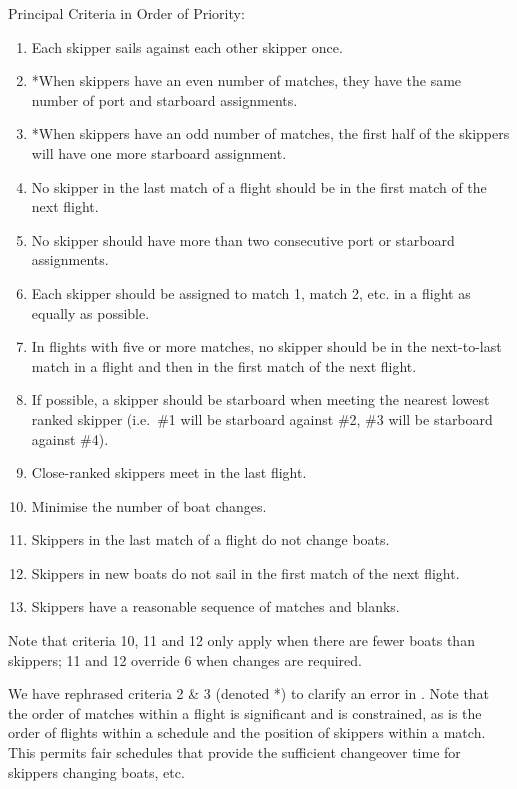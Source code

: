 \documentclass{llncs}
\begin{document}
\begin{framed}
Principal Criteria in Order of Priority:
\begin{enumerate}
\item Each skipper sails against each other skipper once.
\item *When skippers have an even number of matches, they have the same number of port and starboard assignments.
\item *When skippers have an odd number of matches, the first half of the skippers
    will have one more starboard assignment.
\item No skipper in the last match of a flight should be in the first match of
    the next flight.
\item No skipper should have more than two consecutive port or starboard
    assignments.
\item Each skipper should be assigned to match 1, match 2, etc. in a flight as
    equally as possible.
\item In flights with five or more matches, no skipper should be in the
    next-to-last match in a flight and then in the first match of the next
    flight.
\item If possible, a skipper should be starboard when meeting the nearest
    lowest ranked skipper (i.e.\ \#1 will be starboard against \#2, \#3 will be
    starboard against \#4).
\item Close-ranked skippers meet in the last flight.
\item Minimise the number of boat changes.
\item Skippers in the last match of a flight do not change boats.
\item Skippers in new boats do not sail in the first match of the next flight.
\item Skippers have a reasonable sequence of matches and blanks.
\end{enumerate}
Note that criteria 10, 11 and 12 only apply when there are fewer boats than
skippers; 11 and 12 override 6 when changes are required.
\end{framed}

We have rephrased criteria 2 \& 3 (denoted *) to clarify an error in \cite{isaf}. Note that the order of matches within a flight is significant and is constrained, as is the order of flights within a schedule and the position of skippers within a match. This permits fair schedules that provide the sufficient changeover time for skippers changing boats, etc.
\end{document}
